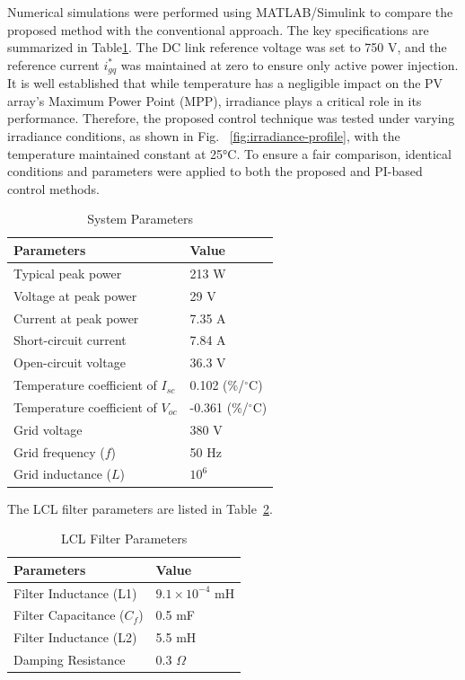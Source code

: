 \documentclass[preprint,12pt]{elsarticle}
\begin{document}
Numerical simulations were performed using MATLAB/Simulink to compare the proposed method with the conventional approach. The key specifications are summarized in Table\ref{tab:system-params}. The DC link reference voltage was set to 750 V, and the reference current \(i^*_{gq}\) was maintained at zero to ensure only active power injection. It is well established that while temperature has a negligible impact on the PV array's Maximum Power Point (MPP), irradiance plays a critical role in its performance. Therefore, the proposed control technique was tested under varying irradiance conditions, as shown in Fig. ~\ref{fig:irradiance-profile}, with the temperature maintained constant at 25°C. To ensure a fair comparison, identical conditions and parameters were applied to both the proposed and PI-based control methods.
\begin{table}[htbp]
    \centering
    \caption{System Parameters}
    \label{tab:system-params}
    \begin{tabular}{p{6cm} p{4cm}}
        \toprule
        \textbf{Parameters} & \textbf{Value} \\
        \midrule
        Typical peak power & 213 W \\
        Voltage at peak power & 29 V \\
        Current at peak power & 7.35 A \\
        Short-circuit current & 7.84 A \\
        Open-circuit voltage & 36.3 V \\
        Temperature coefficient of $I_{sc}$ & 0.102 (\%/$^{\circ}$C) \\
        Temperature coefficient of $V_{oc}$ & -0.361 (\%/$^{\circ}$C) \\
        Grid voltage & 380 V \\
        Grid frequency ($f$) & 50 Hz \\
        Grid inductance ($L$) & $10^6$ \\
        \bottomrule
    \end{tabular}
\end{table}
The LCL filter parameters are listed in Table~\ref{tab:lcl-params}.
\begin{table}[htbp]
    \centering
    \caption{LCL Filter Parameters}
    \label{tab:lcl-params}
    \begin{tabular}{p{6cm} p{4cm}}
        \toprule
        \textbf{Parameters} & \textbf{Value} \\
        \midrule
        Filter Inductance (L1) & $9.1 \times 10^{-4}$ mH \\
        Filter Capacitance ($C_f$) & 0.5 mF \\
        Filter Inductance (L2) & 5.5 mH \\
        Damping Resistance & 0.3 $\Omega$ \\
        \bottomrule
    \end{tabular}
\end{table}
\end{document}
